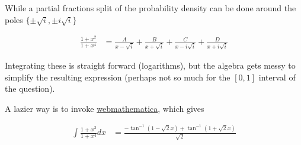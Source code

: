 \documentclass{article}
\begin{document}
While a partial fractions split of the probability density can be done
around the poles $\{\pm\sqrt{i}, \pm i \sqrt{i}\}$

\begin{align*}
\frac{1 + x^2}{1 + x^4} &=
\frac{A}{x -\sqrt{i}}
+\frac{B}{x +\sqrt{i}}
+\frac{C}{x -i\sqrt{i}}
+\frac{D}{x +i\sqrt{i}}
\end{align*}

Integrating these is straight forward (logarithms), but
the algebra gets messy to simplify the resulting expression (perhaps not so
much for the $[0,1]$ interval of the question).

A lazier way is to invoke \href{http://integrals.wolfram.com/index.jsp}{webmathematica}, which gives

\begin{align*}
\int \frac{1 + x^2}{1 + x^4} dx &=
\frac{-\tan^{-1}(1 - \sqrt{2} x) + \tan^{-1}(1 + \sqrt{2} x)}{ \sqrt{2} }
\end{align*}



\end{document}
